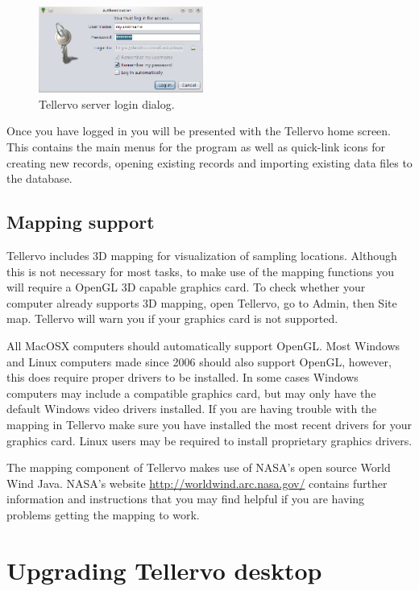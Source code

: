 \begin{figure}
  \begin{center}
    \includegraphics[width=0.48\textwidth]{Images/login.png}
  \end{center}
  \caption{Tellervo server login dialog.}
  \label{fig:login}
\end{figure}

Once you have logged in you will be presented with the Tellervo home screen.  This contains the main menus for the program as well as quick-link icons for creating new records, opening existing records and importing existing data files to the database.


\subsection{Mapping support}
Tellervo includes 3D mapping for visualization of sampling locations. Although this is not necessary for most tasks, to make use of the mapping functions you will require a OpenGL 3D capable graphics card. To check whether your computer already supports 3D mapping, open Tellervo, go to Admin, then Site map.  Tellervo will warn you if your graphics card is not supported.

All MacOSX computers should automatically support OpenGL.  Most Windows and Linux computers made since 2006 should also support OpenGL, however, this does require proper drivers to be installed. In some cases Windows computers may include a compatible graphics card, but may only have the default Windows video drivers installed.  If you are having trouble with the mapping in Tellervo make sure you have installed the most recent drivers for your graphics card.  Linux users may be required to install proprietary graphics drivers.  

The mapping component of Tellervo makes use of NASA's open source World Wind Java.  NASA's website \url{http://worldwind.arc.nasa.gov/} contains further information and instructions that you may find helpful if you are having problems getting the mapping to work.  


\section{Upgrading Tellervo desktop}

